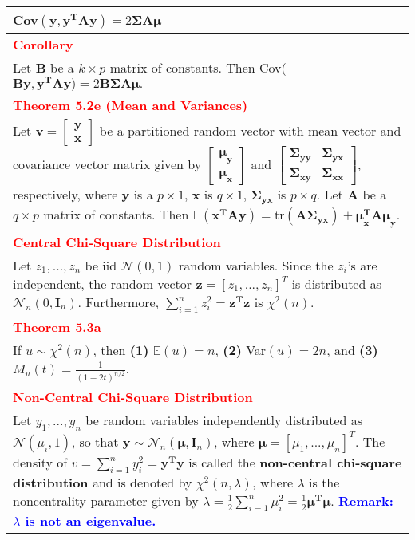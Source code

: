 \documentclass[a4paper,11pt]{article}
\begin{document}
\begin{longtable}{|p{17 cm}|}
\indent Cov$(\mathbf{y,y^TAy})=2\boldsymbol{\Sigma A\mu}$ \\
\hline
\textcolor{red}{\textbf{Corollary}}\\
Let $\mathbf{B}$ be a $k\times p$ matrix of constants. Then Cov($\mathbf{By,y^TAy})=2\boldsymbol{B\Sigma A\mu}.$ \\
\hline
\textcolor{red}{\textbf{Theorem 5.2e (Mean and Variances)}}\\
Let $ \mathbf{v}=\begin{bmatrix} \mathbf{y}\\ \mathbf{x}\end{bmatrix} $ be a partitioned random vector with mean vector and covariance vector matrix given by $\begin{bmatrix} \boldsymbol{\mu_y}\\ \boldsymbol{\mu_x}\end{bmatrix} $ and $\begin{bmatrix} \boldsymbol{\Sigma_{yy}} & \boldsymbol{\Sigma_{yx}} \\ \boldsymbol{\Sigma_{xy}} & \boldsymbol{\Sigma_{xx}}\end{bmatrix} $, respectively, where $\mathbf{y}$ is a $p\times 1$, $\mathbf{x}$ is $q\times 1$, $\boldsymbol{\Sigma_{yx}}$ is $p\times q.$ Let $\mathbf{A}$ be a $q\times p$ matrix of constants. Then $\mathbb{E}(\mathbf{x^TAy})=\text{tr}\boldsymbol{(A\Sigma _{yx})+\mu^T_xA\mu_y}$. \\
\hline
\textcolor{red}{\textbf{Central Chi-Square Distribution}} \\
Let $z_1,...,z_n$ be iid $\mathcal{N}(0,1)$ random variables. Since the $z_i$'s are independent, the random vector $\mathbf{z}=[z_1,...,z_n]^T$ is distributed as $\mathcal{N}_n(0,\mathbf{I}_n)$. Furthermore, $\sum_{i=1}^n z_i^2=\mathbf{z^T z}$ is $\chi ^2(n).$\\
\hline
\textcolor{red}{\textbf{Theorem 5.3a}}\\
If $u\sim\chi ^2(n)$, then \textbf{(1)} $\mathbb{E}(u)=n$, \textbf{(2)} Var$(u)=2n$, and \textbf{(3)} $M_u(t)=\frac{1}{(1-2t)^{n/2}}$.\\
\hline
\textcolor{red}{\textbf{Non-Central Chi-Square Distribution}}\\
Let $y_1,...,y_n$ be random variables independently distributed as $\mathcal{N}(\mu_i,1)$, so that $\mathbf{y}\sim\mathcal{N}_n(\boldsymbol{\mu},\boldsymbol{I}_n)$, where $\boldsymbol{\mu}=[\mu_1,...,\mu_n]^T$. The density of $v=\sum_{i=1}^n y^2_i=\mathbf{y^Ty}$ is called the \textbf{non-central chi-square distribution} and is denoted by $\chi^2(n,\lambda)$, where $\lambda$ is the noncentrality parameter given by $\lambda=\frac{1}{2}\sum_{i=1}^n \mu_i^2=\frac{1}{2}\boldsymbol{\mu^T\mu}$. \textcolor{blue}{\textbf{Remark: $\lambda$ is not an eigenvalue.}}\\

\end{longtable}
\end{document}
